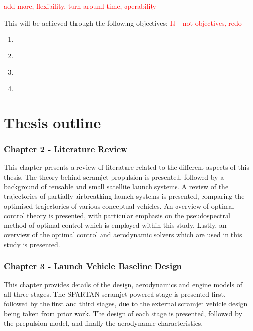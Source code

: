     \textcolor{red}{add more, flexibility, turn around time, operability}
    

    \noindent This will be achieved through the following objectives:
 \textcolor{red}{IJ - not objectives, redo}
    \begin{enumerate}
    	 \item \emph{}\\


\item \emph{}\\

    	
      \item \emph{}\\


      \item \emph{}\\



    \end{enumerate}

  \clearpage
  \section{Thesis outline}

    

    \subsubsection*{Chapter 2 - Literature Review}

      This chapter presents a review of literature related to the different aspects of this thesis. The theory behind scramjet propulsion is presented, followed by a background of reusable and small satellite launch systems. A review of the trajectories of partially-airbreathing launch systems is presented, comparing the optimised trajectories of various conceptual vehicles. An overview of optimal control theory is presented, with particular emphasis on the pseudospectral method of optimal control which is employed within this study. Lastly, an overview of the optimal control and aerodynamic solvers which are used in this study is presented.
      

    \subsubsection*{Chapter 3 - Launch Vehicle Baseline Design}

      This chapter provides details of the design, aerodynamics and engine models of all three stages. The SPARTAN scramjet-powered stage is presented first, followed by the first and third stages, due to the external scramjet vehicle design being taken from prior work. The design of each stage is presented, followed by the propulsion model, and finally the aerodynamic characteristics. 
      
